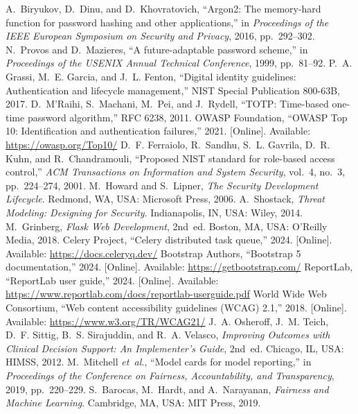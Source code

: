 \documentclass[12pt]{article}
\begin{document}
\begin{thebibliography}{00}
 A.~Biryukov, D.~Dinu, and D.~Khovratovich, ``Argon2: The memory-hard function for password hashing and other applications,'' in \emph{Proceedings of the IEEE European Symposium on Security and Privacy}, 2016, pp.~292--302.
 N.~Provos and D.~Mazieres, ``A future-adaptable password scheme,'' in \emph{Proceedings of the USENIX Annual Technical Conference}, 1999, pp.~81--92.
 P.~A. Grassi, M.~E. Garcia, and J.~L. Fenton, ``Digital identity guidelines: Authentication and lifecycle management,'' NIST Special Publication 800-63B, 2017.
 D.~M'Raihi, S.~Machani, M.~Pei, and J.~Rydell, ``TOTP: Time-based one-time password algorithm,'' RFC 6238, 2011.
 OWASP Foundation, ``OWASP Top 10: Identification and authentication failures,'' 2021. [Online]. Available: \url{https://owasp.org/Top10/}
 D.~F. Ferraiolo, R.~Sandhu, S.~L. Gavrila, D.~R. Kuhn, and R.~Chandramouli, ``Proposed NIST standard for role-based access control,'' \emph{ACM Transactions on Information and System Security}, vol.~4, no.~3, pp.~224--274, 2001.
 M.~Howard and S.~Lipner, \emph{The Security Development Lifecycle}. Redmond, WA, USA: Microsoft Press, 2006.
 A.~Shostack, \emph{Threat Modeling: Designing for Security}. Indianapolis, IN, USA: Wiley, 2014.
 M.~Grinberg, \emph{Flask Web Development}, 2nd~ed. Boston, MA, USA: O'Reilly Media, 2018.
 Celery Project, ``Celery distributed task queue,'' 2024. [Online]. Available: \url{https://docs.celeryq.dev/}
 Bootstrap Authors, ``Bootstrap 5 documentation,'' 2024. [Online]. Available: \url{https://getbootstrap.com/}
 ReportLab, ``ReportLab user guide,'' 2024. [Online]. Available: \url{https://www.reportlab.com/docs/reportlab-userguide.pdf}
 World Wide Web Consortium, ``Web content accessibility guidelines (WCAG) 2.1,'' 2018. [Online]. Available: \url{https://www.w3.org/TR/WCAG21/}
 J.~A. Osheroff, J.~M. Teich, D.~F. Sittig, B.~S. Sirajuddin, and R.~A. Velasco, \emph{Improving Outcomes with Clinical Decision Support: An Implementer's Guide}, 2nd~ed. Chicago, IL, USA: HIMSS, 2012.
 M.~Mitchell \emph{et~al.}, ``Model cards for model reporting,'' in \emph{Proceedings of the Conference on Fairness, Accountability, and Transparency}, 2019, pp.~220--229.
 S.~Barocas, M.~Hardt, and A.~Narayanan, \emph{Fairness and Machine Learning}. Cambridge, MA, USA: MIT Press, 2019.
\end{thebibliography}
\end{document}
